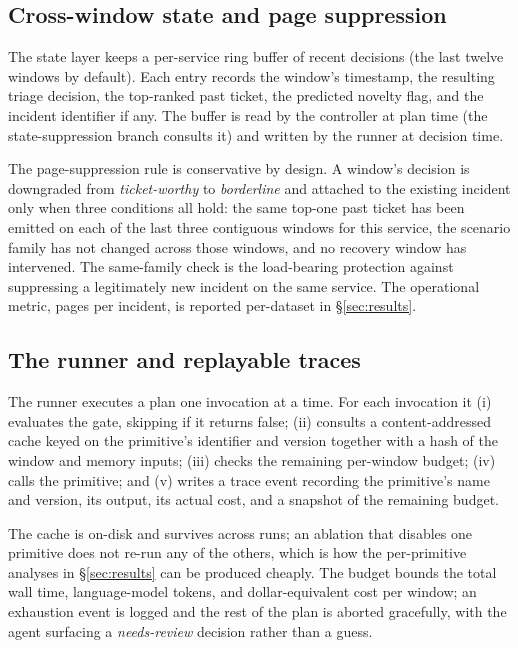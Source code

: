 \subsection{Cross-window state and page suppression}
\label{sec:approach:state}

The state layer keeps a per-service ring buffer of recent decisions (the last twelve windows by default). Each entry records the window's timestamp, the resulting triage decision, the top-ranked past ticket, the predicted novelty flag, and the incident identifier if any. The buffer is read by the controller at plan time (the state-suppression branch consults it) and written by the runner at decision time.

The page-suppression rule is conservative by design. A window's decision is downgraded from \emph{ticket-worthy} to \emph{borderline} and attached to the existing incident only when three conditions all hold: the same top-one past ticket has been emitted on each of the last three contiguous windows for this service, the scenario family has not changed across those windows, and no recovery window has intervened. The same-family check is the load-bearing protection against suppressing a legitimately new incident on the same service. The operational metric, pages per incident, is reported per-dataset in \S\ref{sec:results}.

\subsection{The runner and replayable traces}
\label{sec:approach:runner}

The runner executes a plan one invocation at a time. For each invocation it (i) evaluates the gate, skipping if it returns false; (ii) consults a content-addressed cache keyed on the primitive's identifier and version together with a hash of the window and memory inputs; (iii) checks the remaining per-window budget; (iv) calls the primitive; and (v) writes a trace event recording the primitive's name and version, its output, its actual cost, and a snapshot of the remaining budget.

The cache is on-disk and survives across runs; an ablation that disables one primitive does not re-run any of the others, which is how the per-primitive analyses in \S\ref{sec:results} can be produced cheaply. The budget bounds the total wall time, language-model tokens, and dollar-equivalent cost per window; an exhaustion event is logged and the rest of the plan is aborted gracefully, with the agent surfacing a \emph{needs-review} decision rather than a guess.

